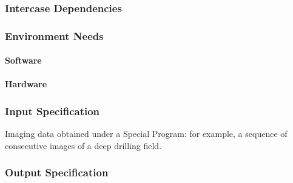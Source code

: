 \subsubsection{Intercase Dependencies}

\subsubsection{Environment Needs}

\paragraph{Software}

\paragraph{Hardware}

\subsubsection{Input Specification}
Imaging data obtained under a Special Program: for example, a sequence
of consecutive images of a deep drilling field.


\subsubsection{Output Specification}

